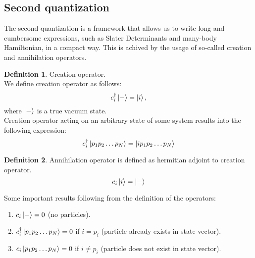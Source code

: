 \documentclass[twoside,english]{uiofysmaster}
\theoremstyle{definition}
\newtheorem{defn}{Definition}
\begin{document}
\subsection{Second quantization}
The second quantization is a framework that allows us to write long and cumbersome expressions, such as Slater Determinants and many-body Hamiltonian, in a compact way. This is achived by the usage of so-called creation and annihilation operators.
\cite{umrigarObservationsVariationalProjector2015}
\begin{defn} Creation operator. \\
	We define creation operator as follows:
	\begin{equation}
	c_i^\dagger\ket{-}=\ket{i},
	\end{equation}
	where $\ket{-}$ is a true vacuum state.\\
	Creation operator acting on an arbitrary state of some system results into the following expression:
	\begin{equation}
	c_i^\dagger\ket{p_1 p_2  \dots p_N}=\ket{i p_1p_2 \dots p_N}	
	\end{equation}
\end{defn}
\begin{defn}
	Annihilation operator is defined as hermitian adjoint to creation operator. \\
		\begin{equation}
		c_i\ket{i}=\ket{-}	
		\end{equation}
\end{defn}
Some important results following from the definition of the operators:
\begin{enumerate}
\item $c_i \ket{-}=0$ (no particles).
\item $c_i^\dagger\ket{p_1 p_2  \dots p_N}=0$ if $i=p_i$ (particle already exists in state vector).
\item $c_i\ket{p_1 p_2  \dots p_N}=0$ if $i\neq p_i$ (particle does not exist in state vector).
\end{enumerate}
\end{document}
